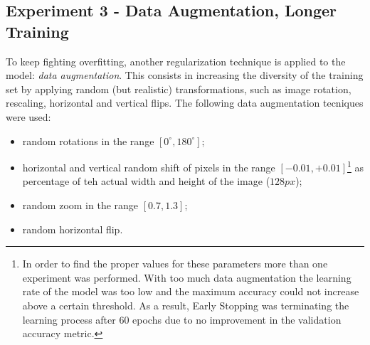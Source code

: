 \documentclass[11pt,a4paper]{article}
\begin{document}
\subsection{Experiment 3 - Data Augmentation, Longer Training}
To keep fighting overfitting, another regularization technique is applied to the model: \textit{data augmentation}. This consists in increasing the diversity of the training set by applying random (but realistic) transformations, such as image rotation, rescaling, horizontal and vertical flips. The following data augmentation tecniques were used:
\begin{itemize}
    \item random rotations in the range $[0^{\circ}, 180^{\circ}]$;
    \item horizontal and vertical random shift of pixels in the range $[-0.01, +0.01]$\footnote{In order to find the proper values for these parameters more than one experiment was performed. With too much data augmentation the learning rate of the model was too low and the maximum accuracy could not increase above a certain threshold. As a result, Early Stopping was terminating the learning process after $60$ epochs due to no improvement in the validation accuracy metric.} as percentage of teh actual width and height of the image ($128px$);
    \item random zoom in the range $[0.7, 1.3]$;
    \item random horizontal flip.
\end{itemize}
\end{document}

